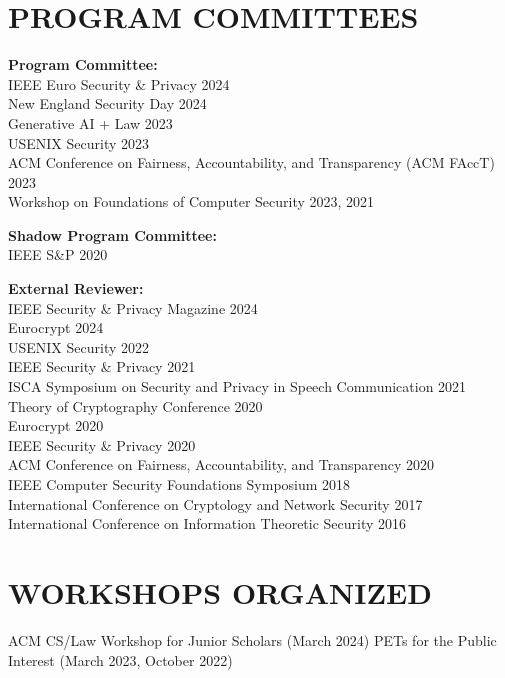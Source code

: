 \documentclass{res}
\begin{document}
\begin{resume}
\section{PROGRAM COMMITTEES}
\vspace{0.1in}

\textbf{Program Committee:} \\
IEEE Euro Security \& Privacy 2024 \\
New England Security Day 2024 \\
Generative AI + Law 2023 \\
USENIX Security 2023 \\
ACM Conference on Fairness, Accountability, and Transparency (ACM FAccT) 2023 \\
Workshop on Foundations of Computer Security 2023, 2021

\textbf{Shadow Program Committee:} \\
IEEE S\&P 2020

\textbf{External Reviewer:} \\
IEEE Security \& Privacy Magazine 2024 \\
Eurocrypt 2024 \\
USENIX Security 2022 \\
IEEE Security \& Privacy 2021 \\
ISCA Symposium on Security and Privacy in Speech Communication 2021 \\
Theory of Cryptography Conference 2020 \\
Eurocrypt 2020 \\
IEEE Security \& Privacy 2020 \\
ACM Conference on Fairness, Accountability, and Transparency 2020 \\
IEEE Computer Security Foundations Symposium 2018 \\
International Conference on Cryptology and Network Security 2017 \\
International Conference on Information Theoretic Security 2016

\vspace{0.25in}

\section{WORKSHOPS ORGANIZED}
\vspace{0.1in}
ACM CS/Law Workshop for Junior Scholars (March 2024)
PETs for the Public Interest (March 2023, October 2022) \\



\end{resume}
\end{document}
